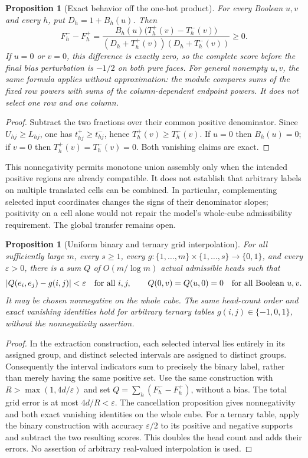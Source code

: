 \documentclass[11pt]{article}
\newtheorem{proposition}[theorem]{Proposition}
\newcommand{\1}{\mathbf 1}
\begin{document}
\begin{proposition}[Exact behavior off the one-hot product]
For every Boolean $u,v$ and every $h$, put $D_h=1+B_h(u)$.
Then
\[
 F_h^--F_h^+=
 \frac{B_h(u)\bigl(T_h^+(v)-T_h^-(v)\bigr)}
 {(D_h+T_h^+(v))(D_h+T_h^-(v))}\geq0.
\]
If $u=0$ or $v=0$, this difference is exactly zero, so the complete score
before the final bias perturbation is $-1/2$ on both pure faces. For general nonempty $u,v$, the same formula
applies without approximation: the module compares sums of the fixed row
powers with sums of the column-dependent endpoint powers. It does not
select one row and one column.
\end{proposition}
\begin{proof}
Subtract the two fractions over their common positive denominator.
Since $U_{hj}\geq L_{hj}$, one has $t^+_{hj}\geq t^-_{hj}$, hence
$T_h^+(v)\geq T_h^-(v)$. If $u=0$ then $B_h(u)=0$; if $v=0$ then
$T_h^+(v)=T_h^-(v)=0$. Both vanishing claims are exact.
\end{proof}

This nonnegativity permits monotone union assembly only when the intended
positive regions are already compatible. It does not establish that arbitrary
labels on multiple translated cells can be combined. In particular,
complementing selected input coordinates changes the signs of their
denominator slopes; positivity on a cell alone would not repair the model's
whole-cube admissibility requirement. The global transfer remains open.



\begin{proposition}[Uniform binary and ternary grid interpolation]
For all sufficiently large $m$, every $s\geq1$, every
$g:\{1,\ldots,m\}\times\{1,\ldots,s\}\to\{0,1\}$, and every
$\varepsilon>0$, there is a sum $Q$ of $O(m/\log m)$ actual admissible
heads such that
\[
 |Q(e_i,e_j)-g(i,j)|<\varepsilon\quad\hbox{for all }i,j,
 \qquad Q(0,v)=Q(u,0)=0\quad\hbox{for all Boolean }u,v.
\]
It may be chosen nonnegative on the whole cube. The same head-count order
and exact vanishing identities hold for arbitrary ternary tables
$g(i,j)\in\{-1,0,1\}$, without the nonnegativity assertion.
\end{proposition}
\begin{proof}
In the extraction construction, each selected interval lies entirely in its
assigned group, and distinct selected intervals are assigned to distinct
groups. Consequently the interval indicators sum to precisely the binary
label, rather than merely having the same positive set. Use the same
construction with $R>\max(1,4d/\varepsilon)$ and set
$Q=\sum_h(F_h^- - F_h^+)$, without a bias. The total grid error is at most
$4d/R<\varepsilon$. The cancellation proposition gives nonnegativity and
both exact vanishing identities on the whole cube. For a ternary table,
apply the binary construction with accuracy $\varepsilon/2$ to its positive
and negative supports and subtract the two resulting scores. This doubles
the head count and adds their errors. No assertion of arbitrary real-valued
interpolation is used.
\end{proof}
\end{document}
